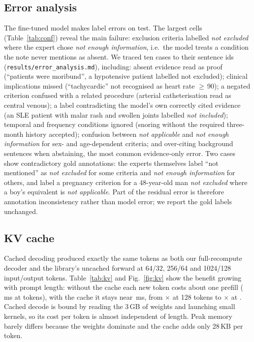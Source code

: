 \documentclass[conference]{IEEEtran}
\newcommand{\code}[1]{\texttt{\small #1}}
\begin{document}
\subsection{Error analysis}
The fine-tuned model makes \TestWrong{} label errors on test. The largest cells (Table~\ref{tab:conf}) reveal the main failure: \TopCell{} exclusion criteria labelled \emph{not excluded} where the expert chose \emph{not enough information}, i.e.\ the model treats a condition the note never mentions as absent. We traced ten cases to their sentence ids (\code{results/error\_analysis.md}), including: absent evidence read as proof (``patients were moribund'', a hypotensive patient labelled not excluded); clinical implications missed (``tachycardic'' not recognised as heart rate $\geq$\,90); a negated criterion confused with a related procedure (arterial catheterisation read as central venous); a label contradicting the model's own correctly cited evidence (an SLE patient with malar rash and swollen joints labelled \emph{not included}); temporal and frequency conditions ignored (snoring without the required three-month history accepted); confusion between \emph{not applicable} and \emph{not enough information} for sex- and age-dependent criteria; and over-citing background sentences when abstaining, the most common evidence-only error. Two cases show contradictory gold annotations: the experts themselves label ``not mentioned'' as \emph{not excluded} for some criteria and \emph{not enough information} for others, and label a pregnancy criterion for a 48-year-old man \emph{not excluded} where a boy's equivalent is \emph{not applicable}. Part of the residual error is therefore annotation inconsistency rather than model error; we report the gold labels unchanged.




\subsection{KV cache}
Cached decoding produced exactly the same tokens as both our full-recompute decoder and the library's uncached forward at 64/32, 256/64 and 1024/128 input/output tokens. Table~\ref{tab:kv} and Fig.~\ref{fig:kv} show the benefit growing with prompt length: without the cache each new token costs about one prefill (\KvNoCacheMs{}\,ms at \KvMaxInput{} tokens), with the cache it stays near \KvCachedMs{}\,ms, from \KvFirstSpeedup$\times$ at 128 tokens to \KvMaxSpeedup$\times$ at \KvMaxInput{}. Cached decode is bound by reading the 3\,GB of weights and launching small kernels, so its cost per token is almost independent of length. Peak memory barely differs because the weights dominate and the cache adds only 28\,KB per token.
\end{document}
